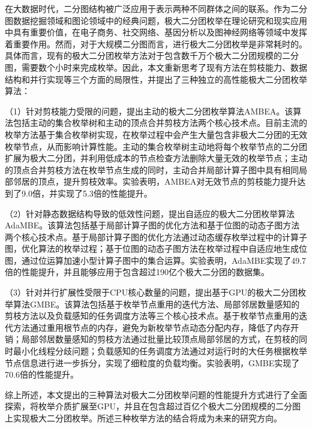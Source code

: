 \cleardoublepage
{}

在大数据时代，二分图结构被广泛应用于表示两种不同群体之间的联系。作为二分图数据挖掘领域和图论领域中的经典问题，极大二分团枚举在理论研究和现实应用中具有重要价值，在电子商务、社交网络、基因分析以及图神经网络等领域中发挥着重要作用。然而，对于大规模二分图而言，进行极大二分团枚举是非常耗时的。具体而言，现有的极大二分团枚举方法对于包含数千万个极大二分团规模的二分图，需要数个小时来完成枚举。因此，本文重新思考了现有方法在剪枝能力、数据结构和并行实现等三个方面的局限性，并提出了三种独立的高性能极大二分团枚举算法：

（1）针对剪枝能力受限的问题，提出主动的极大二分团枚举算法AMBEA。该算法包括主动的集合枚举树和主动的顶点合并剪枝方法两个核心技术点。目前主流的枚举方法基于集合枚举树实现，在枚举过程中会产生大量包含非极大二分团的无效枚举节点，从而影响计算性能。主动的集合枚举树主动地将每个枚举节点的二分团扩展为极大二分团，并利用低成本的节点检查方法删除大量无效的枚举节点；主动的顶点合并剪枝方法在枚举节点生成的同时，主动合并局部计算子图中具有相同局部邻居的顶点，提升剪枝效率。实验表明，AMBEA对无效节点的剪枝能力提升达到了9.0倍，并实现了5.3倍的性能提升。

（2）针对静态数据结构导致的低效性问题，提出自适应的极大二分团枚举算法AdaMBE。该算法包括基于局部计算子图的优化方法和基于位图的动态子图方法两个核心技术点。基于局部计算子图的优化方法通过动态缓存枚举过程中的计算子图，优化算法的枚举过程；基于位图的动态子图方法在枚举过程中自适应地生成位图，通过位运算加速小型计算子图中的集合运算。实验表明，AdaMBE实现了49.7倍的性能提升，并且能够应用于包含超过190亿个极大二分团的数据集。

（3）针对并行扩展性受限于CPU核心数量的问题，提出基于GPU的极大二分团枚举算法GMBE。该算法包括基于枚举节点重用的迭代方法、局部邻居数量感知的剪枝方法以及负载感知的任务调度方法等三个核心技术点。基于枚举节点重用的迭代方法通过重用根节点的内存，避免为新枚举节点动态分配内存，降低了内存开销；局部邻居数量感知的剪枝方法通过批量比较顶点局部邻居的方式，在剪枝的同时最小化线程分歧问题；负载感知的任务调度方法通过对运行时的大任务根据枚举节点信息进行进一步拆分，实现了细粒度的负载均衡。实验表明，GMBE实现了70.6倍的性能提升。

综上所述，本文提出的三种算法对极大二分团枚举问题的性能提升方式进行了全面探索，将枚举介质扩展至GPU，并且在包含超过百亿个极大二分团规模的二分图上实现极大二分团枚举。所述三种枚举方法的结合将成为未来的研究方向。


